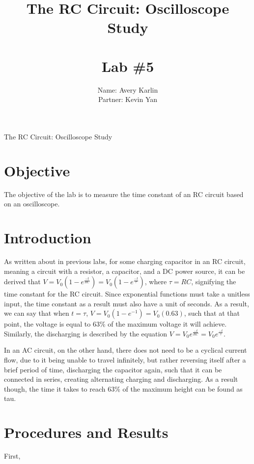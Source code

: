\documentclass[11pt, titlepage]{article}
\title{The RC Circuit: Oscilloscope Study \\ \ \\ \large Lab \#5}
\author{Name: Avery Karlin \\ Partner: Kevin Yan}
\date{}
\begin{document}
\maketitle

\begin{center}
\LARGE The RC Circuit: Oscilloscope Study
\end{center}

\section*{Objective}
The objective of the lab is to measure the time constant of an RC circuit based on an oscilloscope.

\section*{Introduction}
As written about in previous labs, for some charging capacitor in an RC circuit, meaning a circuit with a resistor, a capacitor, and a DC power source, it can be derived that $V = V_0(1 - e^{\frac{-t}{RC}}) = V_0(1 - e^{\frac{-t}{\tau}})$, where $\tau = RC$, signifying the time constant for the RC circuit. Since exponential functions must take a unitless input, the time constant as a result must also have a unit of seconds. As a result, we can say that when $t = \tau$, $V = V_0(1 - e^{-1}) = V_0(0.63)$, such that at that point, the voltage is equal to 63\% of the maximum voltage it will achieve. Similarly, the discharging is described by the equation $V = V_0e^{\frac{-t}{RC}} = V_0e^{\frac{-t}{\tau}}$.

In an AC circuit, on the other hand, there does not need to be a cyclical current flow, due to it being unable to travel infinitely, but rather reversing itself after a brief period of time, discharging the capacitor again, such that it can be connected in series, creating alternating charging and discharging. As a result though, the time it takes to reach 63\% of the maximum height can be found as tau.

\section*{Procedures and Results}

First, 
\end{document}
